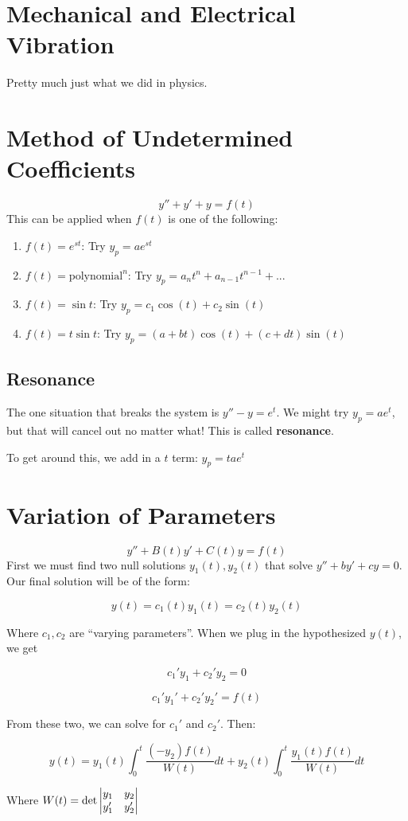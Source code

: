 \documentclass[a4paper,12pt]{report}
\begin{document}
\section{Mechanical and Electrical Vibration}
Pretty much just what we did in physics.

\section{Method of Undetermined Coefficients}
$$y'' + y' + y = f(t)$$
This can be applied when $f(t)$ is one of the following: 
\begin{enumerate}
\item $f(t) = e^{st}$: Try $y_p = ae^{st}$
\item $f(t) = \text{polynomial}^n$: Try $y_p = a_n t^n + a_{n-1}t^{n-1} + ...$
\item $f(t) = \sin t$: Try $y_p = c_1\cos(t) + c_2\sin(t)$
\item $f(t) = t\sin t$: Try $y_p = (a+bt)\cos(t) + (c+dt)\sin(t)$
\end{enumerate}
\subsection{Resonance}
The one situation that breaks the system is $y'' - y = e^t$. We might try $y_p = ae^t$, but that will cancel out no matter what! 
This is called \textbf{resonance}. 

To get around this, we add in a $t$ term: $y_p = tae^t$

\section{Variation of Parameters}
$$y'' + B(t)y' + C(t)y = f(t)$$
First we must find two null solutions $y_1(t), y_2(t)$ that solve $y'' + by' + cy = 0$. Our final solution will be of the form: 

$$y(t) = c_1(t)y_1(t) = c_2(t)y_2(t)$$

Where $c_1, c_2$ are ``varying parameters''. When we plug in the hypothesized $y(t)$, we get

$$c_1' y_1 + c_2' y_2 = 0$$

$$c_1' y_1' + c_2' y_2' = f(t)$$

From these two, we can solve for $c_1'$ and $c_2'$. Then: 

$$y(t) = y_1(t) \int_0^t \frac{(-y_2)f(t)}{W(t)} dt + y_2(t) \int_0^t \frac{y_1(t)f(t)}{W(t)} dt$$

Where $W(t) = \det \begin{vmatrix}
y_1 & y_2 \\
y_1' & y_2' \notag
\end{vmatrix}$
\end{document}
